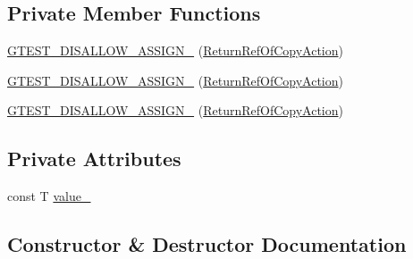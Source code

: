\subsection*{Private Member Functions}
\begin{DoxyCompactItemize}
\item 
\mbox{\hyperlink{classtesting_1_1internal_1_1_return_ref_of_copy_action_a767fa5d48c046e472eaf2353c2e7544c}{G\+T\+E\+S\+T\+\_\+\+D\+I\+S\+A\+L\+L\+O\+W\+\_\+\+A\+S\+S\+I\+G\+N\+\_\+}} (\mbox{\hyperlink{classtesting_1_1internal_1_1_return_ref_of_copy_action}{Return\+Ref\+Of\+Copy\+Action}})
\item 
\mbox{\hyperlink{classtesting_1_1internal_1_1_return_ref_of_copy_action_a767fa5d48c046e472eaf2353c2e7544c}{G\+T\+E\+S\+T\+\_\+\+D\+I\+S\+A\+L\+L\+O\+W\+\_\+\+A\+S\+S\+I\+G\+N\+\_\+}} (\mbox{\hyperlink{classtesting_1_1internal_1_1_return_ref_of_copy_action}{Return\+Ref\+Of\+Copy\+Action}})
\item 
\mbox{\hyperlink{classtesting_1_1internal_1_1_return_ref_of_copy_action_a767fa5d48c046e472eaf2353c2e7544c}{G\+T\+E\+S\+T\+\_\+\+D\+I\+S\+A\+L\+L\+O\+W\+\_\+\+A\+S\+S\+I\+G\+N\+\_\+}} (\mbox{\hyperlink{classtesting_1_1internal_1_1_return_ref_of_copy_action}{Return\+Ref\+Of\+Copy\+Action}})
\end{DoxyCompactItemize}
\subsection*{Private Attributes}
\begin{DoxyCompactItemize}
\item 
const T \mbox{\hyperlink{classtesting_1_1internal_1_1_return_ref_of_copy_action_a41fdd44b2021e01db916c6d5afcbf73f}{value\+\_\+}}
\end{DoxyCompactItemize}


\subsection{Constructor \& Destructor Documentation}
\mbox{\label{classtesting_1_1internal_1_1_return_ref_of_copy_action_a073c18a8b50423b08f6603e860622839}} 
